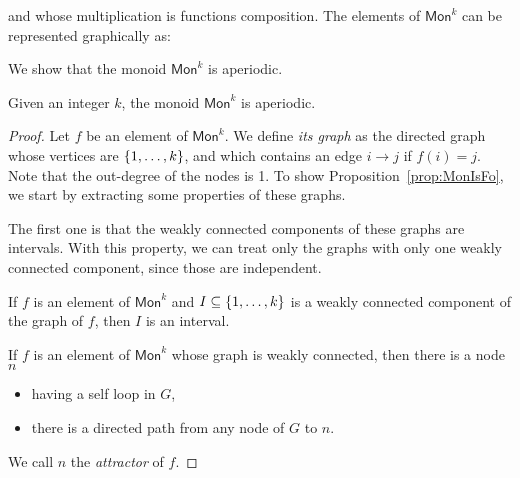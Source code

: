and whose multiplication is functions composition.  The elements of $\mathsf{Mon}^k$ can be represented graphically as:
     

We show that the monoid $\mathsf{Mon}^k$ is aperiodic.
     \begin{proposition}\label{prop:MonIsFo}
Given an integer $k$, the monoid $\mathsf{Mon}^k$ is aperiodic.     
     \end{proposition}
     
     \begin{proof}
     Let $f$ be an element of $\mathsf{Mon}^k$. We define \emph {its graph} as the directed graph whose vertices are $\{1,\dots, k\}$, and which contains an edge $i\rightarrow j$ if $f(i)=j$. Note that the out-degree of the nodes is 1. To show Proposition~\ref{prop:MonIsFo}, we start by extracting some properties of these graphs.
     
The first one is that the weakly connected components of these graphs are intervals. With this property, we can treat only the graphs with only one weakly connected component, since those are independent. 
     \begin{lemma}
     If $f$ is an element of $\mathsf{Mon}^k$ and $I\subseteq \{1,\dots,k\}$ is a weakly connected component of the graph of $f$, then $I$ is an interval. 
     \end{lemma}
     
     \begin{lemma}
     If $f$ is an element of $\mathsf{Mon}^k$ whose graph is weakly connected, then there is a node $n$ 
\begin{itemize}
\item having a self loop in $G$,
\item there is a directed path from any node of $G$ to $n$. 
\end{itemize}     
     \end{lemma}  
     We call $n$ the \emph{attractor} of $f$.
     \end{proof}